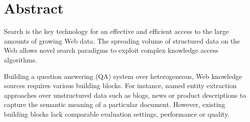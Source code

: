 \chapter*{Abstract}

Search is the key technology for an effective and efficient access to the large amounts of growing Web data. 
The spreading volume of structured data on the Web allows novel search paradigms to exploit complex knowledge access algorithms.

Building a question answering (QA) system over heterogeneous, Web knowledge sources requires various building blocks.
For instance, named entity extraction approaches over unstructured data such as blogs, news or product descriptions to capture the semantic meaning of a particular document.
However, existing building blocks lack comparable evaluation settings, performance or quality. 

